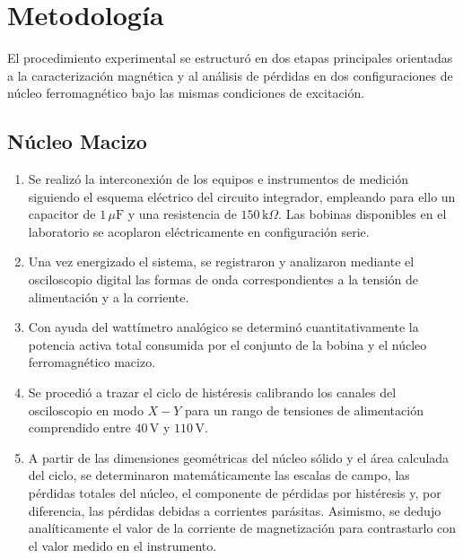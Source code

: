 \section{Metodología}


El procedimiento experimental se estructuró en dos etapas principales orientadas a la caracterización magnética y al análisis de pérdidas en dos configuraciones de núcleo ferromagnético bajo las mismas condiciones de excitación.

\subsection{Núcleo Macizo}
\begin{enumerate}
    \item Se realizó la interconexión de los equipos e instrumentos de medición siguiendo el esquema eléctrico del circuito integrador, empleando para ello un capacitor de $1\,\mu\text{F}$ y una resistencia de $150\,\text{k}\Omega$. Las bobinas disponibles en el laboratorio se acoplaron eléctricamente en configuración serie.
    
    \item Una vez energizado el sistema, se registraron y analizaron mediante el osciloscopio digital las formas de onda correspondientes a la tensión de alimentación y a la corriente.
    
    \item Con ayuda del wattímetro analógico se determinó cuantitativamente la potencia activa total consumida por el conjunto de la bobina y el núcleo ferromagnético macizo.
    
    \item Se procedió a trazar el ciclo de histéresis calibrando los canales del osciloscopio en modo $X-Y$ para un rango de tensiones de alimentación comprendido entre $40\,\text{V}$ y $110\,\text{V}$.
    
    \item  A partir de las dimensiones geométricas del núcleo sólido y el área calculada del ciclo, se determinaron matemáticamente las escalas de campo, las pérdidas totales del núcleo, el componente de pérdidas por histéresis y, por diferencia, las pérdidas debidas a corrientes parásitas. Asimismo, se dedujo analíticamente el valor de la corriente de magnetización para contrastarlo con el valor medido en el instrumento.
\end{enumerate}

